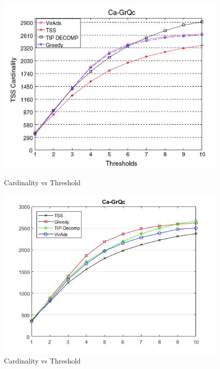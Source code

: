\begin{figure}[h!]
\begin{minipage}[t]{0.50\textwidth}
\includegraphics[width=\linewidth,keepaspectratio=true]{images/ca-grqcpaper.jpg}
\caption{Cardinality vs Threshold}
\label{fase1}
\end{minipage}
\begin{minipage}[t]{0.50\textwidth}
\includegraphics[width=\linewidth,keepaspectratio=true]{images/ca-grqcresult.jpg}
\caption{Cardinality vs Threshold}
\end{minipage}
\end{figure}

